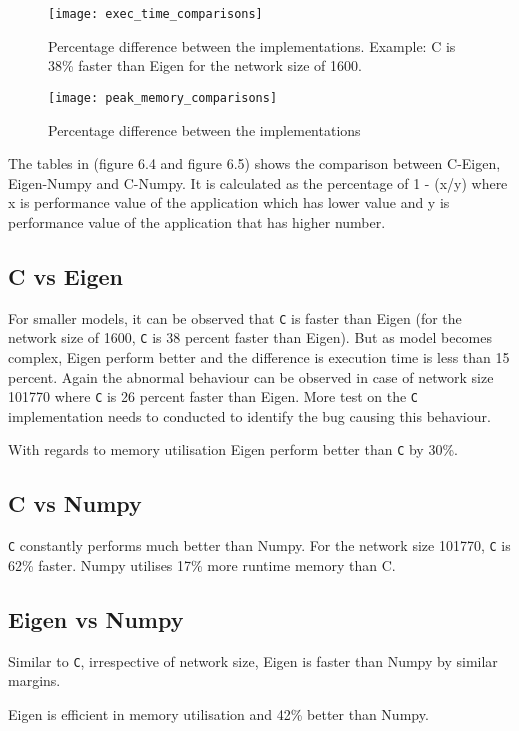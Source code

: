 \begin{figure}[!ht]
	\centering
	\texttt{[image: exec\_time\_comparisons]}
	\caption[Execution Time vs Model Parameters]{Percentage difference between the implementations. Example: C is 38\% faster than Eigen for the network size of 1600.}
\end{figure}

\begin{figure}[ht]
	\centering
	\texttt{[image: peak\_memory\_comparisons]}
	\caption[Peak Memory Utilisation]{Percentage difference between the implementations}
\end{figure}

The tables in (figure 6.4 and figure 6.5) shows the comparison between C-Eigen, Eigen-Numpy and C-Numpy. It is calculated as the percentage of 1 - (x/y) where x is performance value of the application which has lower value and y is performance value of the application that has higher number.

\subsection{C vs Eigen}
For smaller models, it can be observed that \texttt{C} is faster than Eigen (for the network size of 1600, \texttt{C} is 38 percent faster than Eigen). But as model becomes complex, Eigen perform better and the difference is execution time is less than 15 percent. Again the abnormal behaviour can be observed in case of network size 101770 where \texttt{C} is 26 percent faster than Eigen. More test on the \texttt{C} implementation needs to conducted to identify the bug causing this behaviour.

With regards to memory utilisation Eigen perform better than \texttt{C} by 30\%.

\subsection{C vs Numpy}
\texttt{C} constantly performs much better than Numpy. For the network size 101770, \texttt{C} is 62\% faster.
Numpy utilises 17\% more runtime memory than C.

\subsection{Eigen vs Numpy}
Similar to \texttt{C}, irrespective of network size, Eigen is faster than Numpy by similar margins.

Eigen is efficient in memory utilisation and 42\% better than Numpy.

